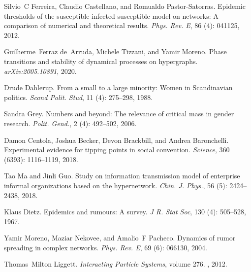 Silvio~C Ferreira, Claudio Castellano, and Romualdo {Pastor-Satorras}.
\newblock Epidemic thresholds of the susceptible-infected-susceptible model on
networks: {{A}} comparison of numerical and theoretical results.
\newblock \emph{Phys. Rev. E}, 86 (4): 041125, 2012.

Guilherme~Ferraz de~Arruda, Michele Tizzani, and Yamir Moreno.
\newblock Phase transitions and stability of dynamical processes on
hypergraphs.
\newblock \emph{arXiv:2005.10891}, 2020.

Drude Dahlerup.
\newblock From a small to a large minority: Women in {{Scandinavian}} politics.
\newblock \emph{Scand Polit. Stud}, 11 (4): 275--298, 1988.

Sandra Grey.
\newblock Numbers and beyond: {{The}} relevance of critical mass in gender
research.
\newblock \emph{Polit. Gend.}, 2 (4): 492--502, 2006.

Damon Centola, Joshua Becker, Devon Brackbill, and Andrea Baronchelli.
\newblock Experimental evidence for tipping points in social convention.
\newblock \emph{Science}, 360 (6393): 1116--1119, 2018.

Tao Ma and Jinli Guo.
\newblock Study on information transmission model of enterprise informal
organizations based on the hypernetwork.
\newblock \emph{Chin. J. Phys.}, 56 (5): 2424--2438, 2018.

Klaus Dietz.
\newblock Epidemics and rumours: {{A}} survey.
\newblock \emph{J R. Stat Soc}, 130 (4): 505--528, 1967.

Yamir Moreno, Maziar Nekovee, and Amalio~F Pacheco.
\newblock Dynamics of rumor spreading in complex networks.
\newblock \emph{Phys. Rev. E}, 69 (6): 066130, 2004.

Thomas~Milton Liggett.
\newblock \emph{Interacting Particle Systems}, volume 276.
, 2012.

